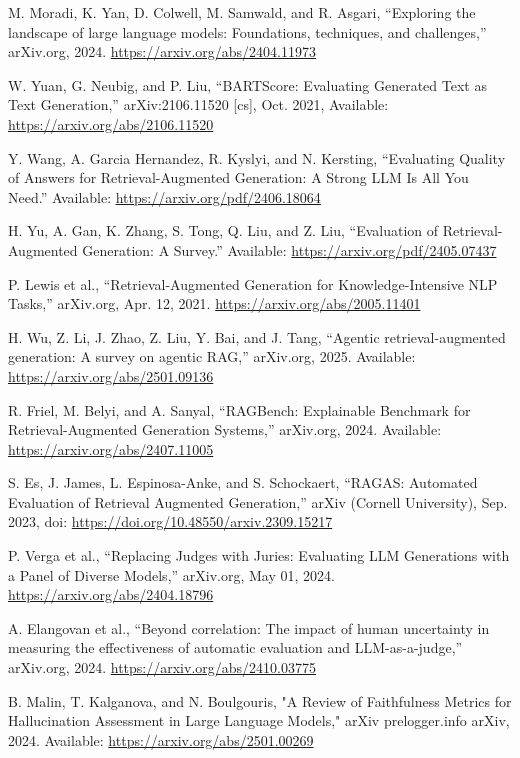 \begin{thebibliography}{00}
 M. Moradi, K. Yan, D. Colwell, M. Samwald, and R. Asgari, “Exploring the landscape of large language models: Foundations, techniques, and challenges,” arXiv.org, 2024. \url{ https://arxiv.org/abs/2404.11973}

W. Yuan, G. Neubig, and P. Liu, “BARTScore: Evaluating Generated Text as Text Generation,” arXiv:2106.11520 [cs], Oct. 2021, Available: \url{https://arxiv.org/abs/2106.11520}

 Y. Wang, A. Garcia Hernandez, R. Kyslyi, and N. Kersting, “Evaluating Quality of Answers for Retrieval-Augmented Generation: A Strong LLM Is All You Need.” Available: \url{https://arxiv.org/pdf/2406.18064}

 H. Yu, A. Gan, K. Zhang, S. Tong, Q. Liu, and Z. Liu, “Evaluation of Retrieval-Augmented Generation: A Survey.” Available: \url{https://arxiv.org/pdf/2405.07437}

 P. Lewis et al., “Retrieval-Augmented Generation for Knowledge-Intensive NLP Tasks,” arXiv.org, Apr. 12, 2021. \url{https://arxiv.org/abs/2005.11401}

 H. Wu, Z. Li, J. Zhao, Z. Liu, Y. Bai, and J. Tang, “Agentic retrieval-augmented generation: A survey on agentic RAG,” arXiv.org, 2025. Available: \url{https://arxiv.org/abs/2501.09136}

 R. Friel, M. Belyi, and A. Sanyal, “RAGBench: Explainable Benchmark for Retrieval-Augmented Generation Systems,” arXiv.org, 2024. Available: \url{https://arxiv.org/abs/2407.11005}

 S. Es, J. James, L. Espinosa-Anke, and S. Schockaert, “RAGAS: Automated Evaluation of Retrieval Augmented Generation,” arXiv (Cornell University), Sep. 2023, doi: \url{https://doi.org/10.48550/arxiv.2309.15217}

 P. Verga et al., “Replacing Judges with Juries: Evaluating LLM Generations with a Panel of Diverse Models,” arXiv.org, May 01, 2024. \url{https://arxiv.org/abs/2404.18796}

 A. Elangovan et al., “Beyond correlation: The impact of human uncertainty in measuring the effectiveness of automatic evaluation and LLM-as-a-judge,” arXiv.org, 2024. \url{https://arxiv.org/abs/2410.03775}

 B. Malin, T. Kalganova, and N. Boulgouris, "A Review of Faithfulness Metrics for Hallucination Assessment in Large Language Models," arXiv prelogger.info arXiv, 2024. Available: \url{https://arxiv.org/abs/2501.00269}


\end{thebibliography}
